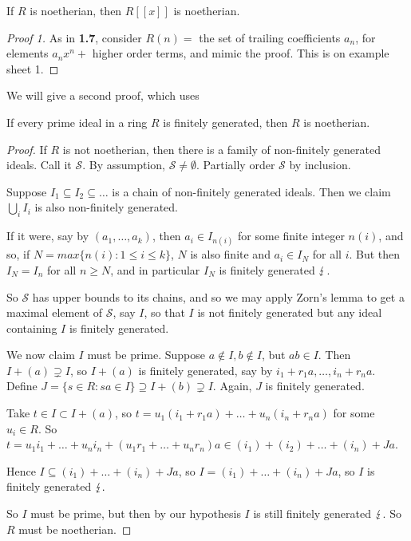 \documentclass[10pt,a4paper]{article}
\begin{document}
\begin{theorem}
  If $R$ is noetherian, then $R[[x]]$ is noetherian.
\end{theorem}
\begin{proof}[Proof 1]
  As in \textbf{1.7}, consider $R(n) =$ the set of trailing coefficients $a_n$, for elements $a_nx^n +$ higher order terms, and mimic the proof. This is on example sheet 1.
\end{proof}
We will give a second proof, which uses
\begin{theorem}
  If every prime ideal in a ring $R$ is finitely generated, then $R$ is noetherian.
\end{theorem}
\begin{proof}
  If $R$ is not noetherian, then there is a family of non-finitely generated ideals. Call it $\mathscr{S}$. By assumption, $\mathscr{S} \neq \emptyset$. Partially order $\mathscr{S}$ by inclusion.

  Suppose $I_1 \subseteq I_2 \subseteq \ldots$ is a chain of non-finitely generated ideals. Then we claim $\bigcup_i I_i$ is also non-finitely generated.

  If it were, say by $(a_1, \ldots, a_k)$, then $a_i \in I_{n(i)}$ for some finite integer $n(i)$, and so, if $N = max \{n(i) : 1\leq i \leq k\}$, $N$ is also finite and $a_i \in I_N$ for all $i$. But then $I_N = I_n$ for all $n \geq N$, and in particular $I_N$ is finitely generated $\lightning$.

  So $\mathscr{S}$ has upper bounds to its chains, and so we may apply Zorn's lemma to get a maximal element of $\mathscr{S}$, say $I$, so that $I$ is not finitely generated but any ideal containing $I$ is finitely generated.

  We now claim $I$ must be prime. Suppose $a \nin I, b \nin I$, but $ab \in I$. Then $I + (a) \supsetneq I$, so $I + (a)$ is finitely generated, say by $i_1 + r_1a, \ldots, i_n + r_na$. Define $J = \{s \in R : sa \in I\} \supseteq I+(b)\supsetneq I$. Again, $J$ is finitely generated.

  Take $t \in I \subset I+(a)$, so $t = u_1(i_1+r_1a) + \ldots + u_n(i_n+r_n a)$ for some $u_i \in R$. So $t = u_1i_1 + \ldots +u_ni_n + (u_1r_1 + \ldots +u_nr_n)a \in (i_1) + (i_2) + \ldots + (i_n) + Ja$.

  Hence $I \subseteq (i_1) + \ldots + (i_n) + Ja$, so $I = (i_1) + \ldots + (i_n) + Ja$, so $I$ is finitely generated $\lightning.$

  So $I$ must be prime, but then by our hypothesis $I$ is still finitely generated $\lightning$. So $R$ must be noetherian.
\end{proof}
\end{document}
